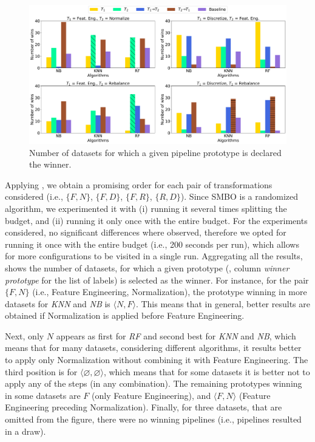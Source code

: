 \begin{figure}[!b]
	\centering
	\includegraphics[width=1.0\textwidth]{chapters/data-centric/supervised/img/experiments_results.pdf}
	\caption{Number of datasets for which a given pipeline prototype is declared the winner.}
	\label{effective-fig:learned-rules-results}
\end{figure}

Applying , we obtain a promising order for each pair of transformations considered (i.e., $\{F,N\}$, $\{F,D\}$, $\{F,R\}$, $\{R,D\}$).
Since SMBO is a randomized algorithm, we experimented it with (i) running it several times splitting the budget, and (ii) running it only once with the entire budget.
For the experiments considered, no significant differences where observed, therefore we opted for running it once with the entire budget (i.e., 200 seconds per run), which allows for more configurations to be visited in a single run. Aggregating all the results,  shows the number of datasets, for which a given prototype (, column \textit{winner prototype} for the list of labels) is selected as the winner.
For instance, for the pair $\{F,N\}$ (i.e., Feature Engineering, Normalization), the prototype winning in more datasets for \textit{KNN} and \textit{NB} is $\langle N, F \rangle$.
This means that in general, better results are obtained if Normalization is applied before Feature Engineering.

Next, only $N$ appears as first for \textit{RF} and second best for \textit{KNN} and \textit{NB}, which means that for many datasets, considering different algorithms, it results better to apply only Normalization without combining it with Feature Engineering.
The third position is for $\langle \varnothing, \varnothing \rangle$, which means that for some datasets it is better not to apply any of the steps (in any combination).
The remaining prototypes winning in some datasets are $F$ (only Feature Engineering), and $\langle F, N \rangle$ (Feature Engineering preceding Normalization).
Finally, for three datasets, that are omitted from the figure, there were no winning pipelines (i.e., pipelines resulted in a draw).

